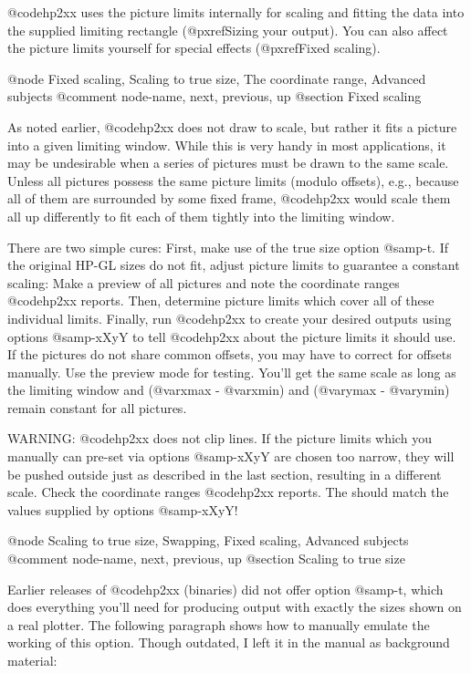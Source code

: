 @code{hp2xx} uses the picture limits internally for scaling and fitting the
data into the supplied  limiting rectangle (@pxref{Sizing your output}).
You can also affect the picture limits yourself for special effects
(@pxref{Fixed scaling}).



@node Fixed scaling, Scaling to true size, The coordinate range, Advanced subjects
@comment  node-name,  next,  previous,  up
@section Fixed scaling

As noted earlier, @code{hp2xx} does not draw to scale, but rather it fits
a picture into a given limiting window. While this is very handy in most
applications, it may be undesirable when a series of pictures must be drawn
to the same scale. Unless all pictures possess the same picture limits
(modulo offsets), e.g., because all of them are surrounded by some fixed
frame, @code{hp2xx} would scale them all up differently to fit each of them
tightly into the limiting window.

There are two simple cures: First, make use of the true size option @samp{-t}.
If the original HP-GL sizes do not fit, adjust picture limits to
guarantee a constant scaling: Make a preview of all pictures and note
the coordinate ranges @code{hp2xx} reports. Then, determine picture limits
which cover all of these individual limits. Finally, run @code{hp2xx}
to create your desired outputs using options @samp{-xXyY} to tell
@code{hp2xx} about the picture limits it should use. If the pictures
do not share common offsets, you may have to correct for offsets
manually. Use the preview mode for testing. You'll get the same scale
as long as the limiting window and (@var{xmax} - @var{xmin}) and
(@var{ymax} - @var{ymin}) remain constant for all pictures.

WARNING: @code{hp2xx} does not clip lines. If the picture limits which
you manually can pre-set via options @samp{-xXyY} are chosen too narrow,
they will be pushed outside just as described in the last section,
resulting in a different scale. Check the coordinate ranges @code{hp2xx}
reports. The should match the values supplied by options @samp{-xXyY}!




@node Scaling to true size, Swapping, Fixed scaling, Advanced subjects
@comment  node-name,  next,  previous,  up
@section Scaling to true size

Earlier releases of @code{hp2xx} (binaries) did not offer option
@samp{-t}, which does everything you'll need for producing output with
exactly the sizes shown on a real plotter. The following paragraph
shows how to manually emulate the working of this option. Though outdated,
I left it in the manual as background material:

